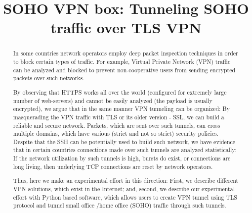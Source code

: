 \documentclass[conference,10pt,letter]{IEEEtran}
\begin{document}
\sloppy
\title{SOHO VPN box: Tunneling SOHO traffic over TLS VPN}
\maketitle
\begin{abstract}

In some countries network operators employ deep packet inspection techniques 
in order to block certain types of traffic. For example, Virtual Private Network 
(VPN) traffic can be analyzed and blocked to prevent non-cooperative users from 
sending encrypted packets over such networks. 

By observing that HTTPS works all over the world (configured for extremely large
number of web-servers) and cannot be easily analyzed (the payload is usually encrypted),
we argue that in the same manner VPN tunneling can be organized: By masquerading 
the VPN traffic with TLS or its older version - SSL, we can build a reliable and 
secure network. Packets, which are sent over such tunnels, can cross multiple
domains, which have various (strict and not so strict) security policies. 
Despite that the SSH can be potentially used to build such network, 
we have evidence that in certain countries connections
made over such tunnels are analyzed statistically: If the network utilization by 
such tunnels is high, bursts do exist, or connections are long living, then 
underlying TCP connections are reset by network operators. 

Thus, here we make an experimental effort in this direction: 
First, we describe different VPN solutions, which exist in the Internet; 
and, second, we describe our experimental effort with Python based software,
which allows users to create VPN tunnel using TLS protocol and tunnel small office
/home office (SOHO) traffic through such tunnels. 

\end{abstract}







\end{document}
